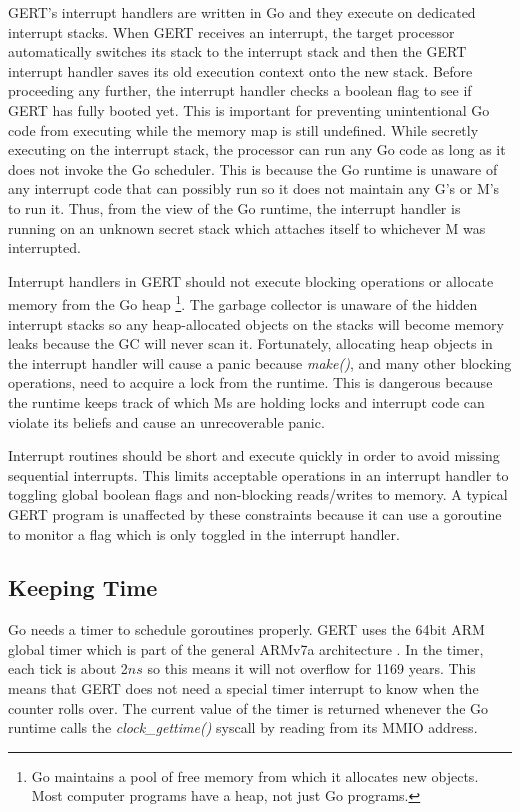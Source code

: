 GERT's interrupt handlers are written in Go and they execute on dedicated interrupt stacks.
When GERT receives an interrupt, the target processor
automatically switches its stack to the interrupt stack and then the GERT interrupt handler saves its old execution context onto the new stack.
Before proceeding any further, the interrupt handler checks a boolean flag to see if GERT has fully booted yet. This is important
for preventing unintentional Go code from executing while the memory map is still undefined.
While secretly executing on the interrupt stack, the processor can run any Go code
as long as it does not invoke the Go scheduler. This is because the Go runtime is unaware
of any interrupt code that can possibly run so it does not maintain any G's or M's to
run it. Thus, from the view of the Go runtime, the interrupt handler is running on an unknown secret stack which attaches itself
to whichever M was interrupted.

Interrupt handlers in GERT should not execute blocking operations or allocate memory from the Go heap \footnote{Go maintains a pool of free memory from which it allocates new objects. Most computer programs have a heap, not just Go programs.}.
The garbage collector is unaware of the hidden interrupt stacks so any heap-allocated objects on the stacks
will become memory leaks because the GC will never scan it. Fortunately, allocating heap objects in the interrupt
handler will cause a panic because \textit{make()}, and many other blocking operations, need to acquire
a lock from the runtime. This is dangerous because the runtime keeps track of which Ms are holding locks
and interrupt code can violate its beliefs and cause an unrecoverable panic.

Interrupt
routines should be short and execute quickly in order to avoid missing sequential
interrupts. This limits acceptable operations in an interrupt handler to toggling global boolean
flags and non-blocking reads/writes to memory. A typical GERT program is unaffected by these constraints
because it can use a goroutine to monitor a flag which is only toggled in the interrupt handler.

\subsection{Keeping Time}

Go needs a timer to schedule goroutines properly. GERT uses the 64bit ARM global timer which
is part of the general ARMv7a architecture \cite{ddi0406}. In the timer, each tick is about 2$ns$ so this means it will
not overflow for 1169 years. This means that GERT does not need a special timer interrupt to know when the
counter rolls over. The current value of the timer is returned whenever the Go runtime calls
the \textit{clock\_gettime()} syscall by reading from its MMIO address.

